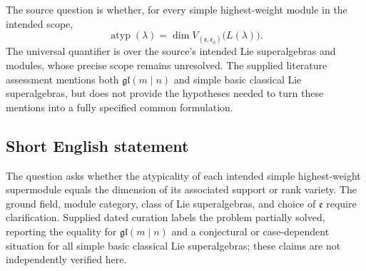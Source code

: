 \documentclass[11pt]{article}
\begin{document}
The source question is whether, for every simple highest-weight module in the intended scope,
\[
\operatorname{atyp}(\lambda)
=\dim V_{(\mathfrak e,\mathfrak e_{\bar 0})}\bigl(L(\lambda)\bigr).
\]
The universal quantifier is over the source's intended Lie superalgebras and modules, whose precise scope remains unresolved. The supplied literature assessment mentions both \(\mathfrak{gl}(m\mid n)\) and simple basic classical Lie superalgebras, but does not provide the hypotheses needed to turn these mentions into a fully specified common formulation.
\subsection{Short English statement}
The question asks whether the atypicality of each intended simple highest-weight supermodule equals the dimension of its associated support or rank variety. The ground field, module category, class of Lie superalgebras, and choice of \(\mathfrak e\) require clarification. Supplied dated curation labels the problem partially solved, reporting the equality for \(\mathfrak{gl}(m\mid n)\) and a conjectural or case-dependent situation for all simple basic classical Lie superalgebras; these claims are not independently verified here.
\end{document}
